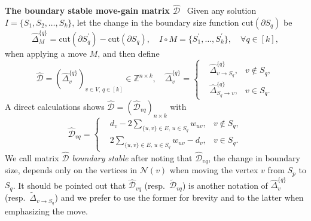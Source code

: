 \documentclass[12pt, a4paper]{article}%
\newcommand{\cut}{\mathrm{cut}}
\numberwithin{equation}{section}
\theoremstyle{plain}
\newcommand{\blue}{\textcolor{blue}}
\begin{document}
\textbf{The boundary stable move-gain matrix $\widehat{\mathcal{D}}$}~
Given any solution $I=\{S_1,S_2,\ldots,S_k\}$, let the change in the boundary size function $\cut(\partial S_q)$ be
\begin{equation}
	\widehat{\Delta}_M^{\{q\}}=\cut(\partial S_q^\prime)-\cut(\partial S_q),\quad I\circ M=\{S_1^\prime,\ldots,S_k^\prime\},\quad\forall q\in [k],
\end{equation}
when applying a move $M$, and then define 
\begin{equation}
	\label{delta::dpartial}
	\widehat{\mathcal{D}}=(\widehat{\Delta}_{v}^{\{q\}})_{v\in V,\,q\in [k]}\in\mathbb{Z}^{n\times k},\quad 	\widehat{\Delta}_v^{\{q\}}=\left\{
	\begin{aligned}
		&\widehat{\Delta}_{v\rightarrow S_q}^{\{q\}}, &v\notin S_q,\\
		&\widehat{\Delta}_{S_q\rightarrow v}^{\{q\}}, &v\in S_q.
	\end{aligned}
	\right.
\end{equation} 
A direct calculations shows $\widehat{\mathcal{D}} = (\widehat{\mathcal{D}}_{vq})_{n\times k}$
with 
\begin{equation}
	\label{delta::value_partial}
	\widehat{\mathcal{D}}_{vq}=\left\{
	\begin{aligned}
		&d_v-2\sum_{\{u,v\}\in E,\, u\in S_q}w_{uv}, &v\notin S_q,\\
		&2\sum_{\{u,v\}\in E,\, u\in S_q}w_{uv}-d_v, &v\in S_q.
	\end{aligned}
	\right.
\end{equation} 
We call matrix $\widehat{\mathcal{D}}$ \emph{boundary stable} after noting that $\widehat{\mathcal{D}}_{vq}$, the change in boundary size,  depends only on the vertices in $\mathcal{N}(v)$ when moving the vertex $v$ from $S_p$ to $S_q$. It should be pointed out that $\widehat{\mathcal{D}}_{vq}$ (resp.~$\widetilde{\mathcal{D}}_{vq}$) is another notation of $\widehat{\Delta}_{v}^{\{q\}}$ (resp.~$\widetilde{\Delta}_{v\rightarrow S_q}$) and we prefer to use the former for brevity and to the latter when emphasizing the move.




\end{document}
